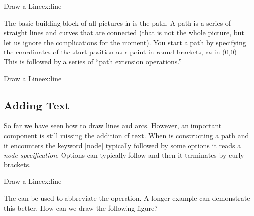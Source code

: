 \begin{texexample}{Draw a Line}{ex:line}
\end{texexample}

The basic building block of all pictures in \tikzname is the path. A path is a series of straight lines and curves
that are connected (that is not the whole picture, but let us ignore the complications for the moment). You
start a path by specifying the coordinates of the start position as a point in round brackets, as in (0,0).
This is followed by a series of \enquote{path extension operations.}


\begin{texexample}{Draw a Line}{ex:line}
\end{texexample}


\subsection*{Adding Text} 

So far we have seen how to draw lines and arcs. However, an important component is still missing the addition of text. When
\tikzname is constructing a path and it encounters the keyword |node| typically followed by some options  it reads a \textit{node specification}. Options can typically follow and then it terminates by curly brackets. 
 

\begin{texexample}{Draw a Line}{ex:line}
\end{texexample}


The  can be used to abbreviate the operation. A longer example can demonstrate this better. How can we draw the following figure?

